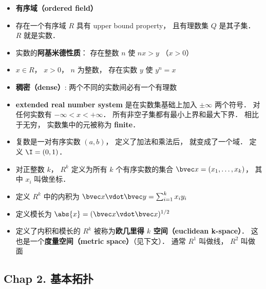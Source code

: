 \begin{itemize}
\item \textbf{有序域（ordered field）}

\item 存在一个有序域 $R$ 具有 upper bound property， 且有理数集 $Q$ 是其子集． $R$ 就是实数．

\item 实数的\textbf{阿基米德性质}： 存在整数 $n$ 使 $nx > y$ （$x > 0$）

\item $x \in R$， $x > 0$， $n$ 为整数， 存在实数 $y$ 使 $y^n = x$

\item \textbf{稠密（dense）}: 两个不同的实数间必有一个有理数

\item \textbf{extended real number system} 是在实数集基础上加入 $\pm\infty$ 两个符号． 对任何实数有 $-\infty < x < +\infty$． 所有非空子集都有最小上界和最大下界． 相比于无穷， 实数集中的元被称为 \textbf{finite}．

\item 复数是一对有序实数 $(a, b)$， 定义了加法和乘法后， 就变成了一个域． 定义 $\I = (0, 1)$．

\item 对正整数 $k$， $R^k$ 定义为所有 $k$ 个有序实数的集合 $\bvec x = (x_1, \dots, x_k)$， 其中 $x_i$ 叫做坐标．

\item 定义 $R^k$ 中的内积为 $\bvec x \vdot \bvec y = \sum_{i = 1}^k x_i y_i$

\item 定义模长为 $\abs{x} = (\bvec x \vdot \bvec x)^{1/2}$

\item 定义了内积和模长的 $R^k$ 被称为\textbf{欧几里得 $k$ 空间（euclidean k-space）}． 这也是一个\textbf{度量空间（metric space）}（见下文）． 通常 $R^1$ 叫做线， $R^2$ 叫做面
\end{itemize}

\subsection{Chap 2. 基本拓扑}


